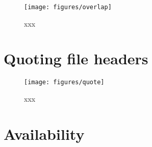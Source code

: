 \documentclass[letterpaper,twocolumn,10pt]{article}
\begin{document}
\begin{figure*}
\texttt{[image: figures/overlap]}
\caption{
xxx
}
\label{fig:overlap}
\end{figure*}

\section{Quoting file headers}

\begin{figure*}
\texttt{[image: figures/quote]}
\caption{
xxx
}
\label{fig:quote}
\end{figure*}


\section*{Availability}




\end{document}
